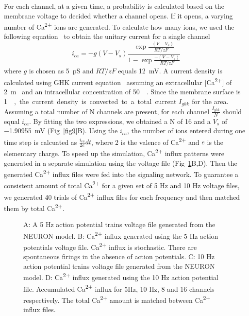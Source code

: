 \documentclass[10pt,letterpaper]{article}
\begin{document}
For each channel, at a given time, a probability is calculated based on the membrane voltage to decided whether a channel opens. If it opens, a varying number of Ca\textsuperscript{2+} ions are generated. To calculate how many ions, we used the following equation~\cite{2013PNAS..11015794T} to obtain the unitary current for a single channel
\begin{equation}i_{ca}=-g(V-V_s)\frac{\exp\frac{-(V-V_s)}{RT/zF}}{1-\exp\frac{-(V-V_s)}{RT/zF}}\end{equation}
where $g$ is chosen as \SI{5}{\pico\siemens} and $RT/zF$ equals \SI{12}{\milli\volt}. A current density is calculated using GHK current equation~\cite{citeulike:306134} assuming an extracellular [Ca\textsuperscript{2+}] of \SI{2}{\m\Molar} and an intracellular concentration of \SI{50}{\nano\Molar}. Since the membrane surface is \SI{1}{\um\square}, the current density is converted to a total current $I_{ghk}$ for the area. Assuming a total number of N channels are present, for each channel $\frac{I_{ghk}}{N}$ should equal $i_{ca}$. By fitting the two expressions, we obtained a N of 16 and a $V_s$ of \SI{-1.90955}{\milli\volt} (Fig~\ref{fig9}B). Using the $i_{ca}$, the number of ions entered during one time step is calcuated as $\frac{i_{ca}}{2e}dt$, where 2 is the valence of Ca\textsuperscript{2+} and $e$ is the elementary charge. To speed up the simulation, Ca\textsuperscript{2+} influx patterns were generated in a separate simulation using the voltage file (Fig~\ref{fig10}B,D). Then the generated Ca\textsuperscript{2+} influx files were fed into the signaling network. To guarantee a consistent amount of total Ca\textsuperscript{2+} for a given set of 5 Hz and 10 Hz voltage files, we generated 40 trials of Ca\textsuperscript{2+} influx files for each frequency and then matched them by total Ca\textsuperscript{2+}.

\begin{figure}[!h]
	\caption{{\bf}
	A: A 5 Hz action potential trains voltage file generated from the NEURON model. B: Ca\textsuperscript{2+} influx generated using the 5 Hz action potentials voltage file. Ca\textsuperscript{2+} influx is stochastic. There are spontaneous firings in the absence of action potentials. C: 10 Hz action potential trains voltage file generated from the NEURON model. D: Ca\textsuperscript{2+} influx generated using the 10 Hz action potential file. Accumulated Ca\textsuperscript{2+} influx for 5Hz, 10 Hz, 8 and 16 channels respectively. The total Ca\textsuperscript{2+} amount is matched between Ca\textsuperscript{2+} influx files.}
\label{fig10}
\end{figure}
\end{document}
